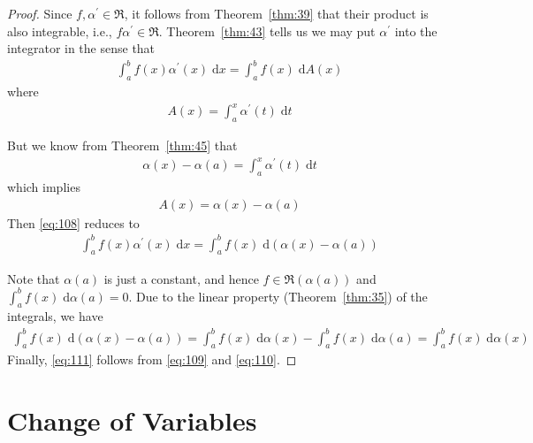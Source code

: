 \documentclass[thmcnt=section, 12pt]{elegantbook}
\begin{document}
\begin{proof}
    Since $f, \alpha^\prime \in \mathfrak{R}$, it follows from Theorem~\ref{thm:39} that their product is also integrable, i.e., $f \alpha^\prime \in \mathfrak{R}$. Theorem~\ref{thm:43} tells us we may put $\alpha^\prime$ into the integrator in the sense that 
    \begin{align}
        \int_a^b f(x) \alpha^\prime(x) \; \mathrm{d}x
        = \int_a^b f(x) \; \mathrm{d} A(x)
        \label{eq:108}
    \end{align}
    where 
    \begin{align*}
        A(x) = \int_a^x \alpha^\prime(t) \; \mathrm{d}t
    \end{align*}

    \par But we know from Theorem~\ref{thm:45} that
    \begin{align*}
        \alpha(x) - \alpha(a) = \int_a^x \alpha^\prime(t) \; \mathrm{d}t
    \end{align*}
    which implies 
    \begin{align*}
        A(x) = \alpha(x) - \alpha(a)
    \end{align*}
    Then \eqref{eq:108} reduces to 
    \begin{align}
        \int_a^b f(x) \alpha^\prime(x) \; \mathrm{d}x
        = \int_a^b f(x) \; \mathrm{d} (\alpha(x) - \alpha(a))
        \label{eq:109}
    \end{align}

    \par Note that $\alpha(a)$ is just a constant, and hence $f \in \mathfrak{R}(\alpha(a))$ and $\int_a^b f (x) \; \mathrm{d} \alpha(a) = 0$. Due to the linear property (Theorem~\ref{thm:35}) of the integrals, we have 
    \begin{align}
        \int_a^b f(x) \; \mathrm{d} (\alpha(x) - \alpha(a))
        = \int_a^b f(x) \; \mathrm{d} \alpha(x) 
        - \int_a^b f(x) \; \mathrm{d} \alpha(a)
        = \int_a^b f(x) \; \mathrm{d} \alpha(x)
        \label{eq:110}
    \end{align}
    Finally, \eqref{eq:111} follows from \eqref{eq:109} and \eqref{eq:110}.
\end{proof}


\section{Change of Variables}
\end{document}
